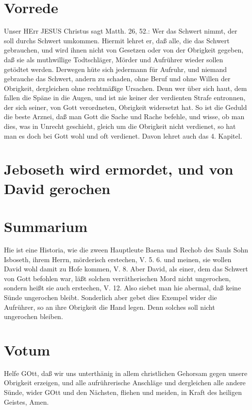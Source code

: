 \section{Vorrede}

Unser HErr JESUS Christus sagt Matth. 26, 52.: Wer das Schwert nimmt, der soll durchs Schwert umkommen. Hiermit lehret er, daß alle, die das Schwert gebrauchen, und wird ihnen nicht von Gesetzen oder von der Obrigkeit gegeben, daß sie als muthwillige Todtschläger, Mörder und Aufrührer wieder sollen getödtet werden. Derwegen hüte sich jedermann für Aufruhr, und niemand gebrauche das Schwert, andern zu schaden, ohne Beruf und ohne Willen der Obrigkeit, dergleichen ohne rechtmäßige Ursachen. Denn wer über sich haut, dem fallen die Späne in die Augen, und ist nie keiner der verdienten Strafe entronnen, der sich seiner, von Gott verordneten, Obrigkeit widersetzt hat. So ist die Geduld die beste Arznei, daß man Gott die Sache und Rache befehle, und wisse, ob man dies, was in Unrecht geschieht, gleich um die Obrigkeit nicht verdienet, so hat man es doch bei Gott wohl und oft verdienet. Davon lehret auch das 4. Kapitel.

\section{Jeboseth wird ermordet, und von David gerochen}

\section{Summarium}

Hie ist eine Historia, wie die zween Hauptleute Baena und Rechob des Sauls Sohn Isboseth, ihrem Herrn, mörderisch erstechen, V. 5. 6. und meinen, sie wollen David wohl damit zu Hofe kommen, V. 8. Aber David, als einer, dem das Schwert von Gott befohlen war, läßt solchen verrätherischen Mord nicht ungerochen, sondern heißt sie auch erstechen, V. 12. Also siebet man hie abermal, daß keine Sünde ungerochen bleibt. Sonderlich aber gebet dies Exempel wider die Aufrührer, so an ihre Obrigkeit die Hand legen. Denn solches soll nicht ungerochen bleiben.

\section{Votum}

Helfe GOtt, daß wir uns unterthänig in allem christlichen Gehorsam gegen unsere Obrigkeit erzeigen, und alle aufrührerische Anschläge und dergleichen alle andere Sünde, wider GOtt und den Nächsten, fliehen und meiden, in Kraft des heiligen Geistes, Amen.

